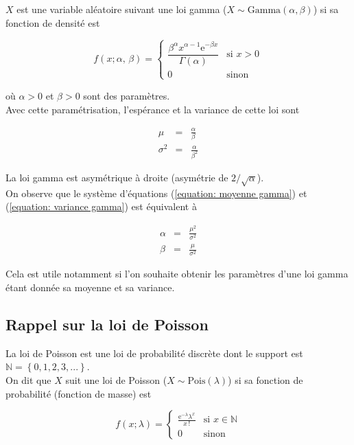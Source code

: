 \documentclass[letterpaper,11pt]{article}
\renewcommand{\exp}[1]{\mathrm{e}^{#1}}
\begin{document}
$X$ est une variable aléatoire suivant une loi gamma ($X\sim\mathrm{Gamma}(\alpha,\beta)$) si sa fonction de densité est

\begin{equation}
f(x; \alpha,\,\beta) =  
\left\{
\begin{array}{cl}
\dfrac{\beta^{\alpha} x^{\alpha-1} \exp{-\beta x}}{\Gamma(\alpha)} & \text{si } x>0\\[0.4cm]
0 & \text{sinon}
\end{array}
\right.
\end{equation}

où $\alpha>0$ et $\beta>0$ sont des paramètres. \\
Avec cette paramétrisation, l'espérance et la variance de cette loi sont

\begin{eqnarray} 
\mu      &=& \frac{\alpha}{\beta} \label{equation: moyenne gamma}\\
\sigma^2 &=& \frac{\alpha}{\beta^2} \label{equation: variance gamma}
\end{eqnarray}

La loi gamma est asymétrique à droite (asymétrie de $2/\sqrt{\alpha}$).\\
On observe que le système d'équations (\ref{equation: moyenne gamma}) et (\ref{equation: variance gamma}) est équivalent à

\begin{eqnarray}
\alpha   &=& \frac{\mu^2}{\sigma^2} \label{equation: alpha gamma}\\
\beta &=& \frac{\mu}{\sigma^2} \label{equation: beta gamma}
\end{eqnarray}

Cela est utile notamment si l'on souhaite obtenir les paramètres d'une loi gamma étant donnée sa moyenne et sa variance.

\subsection{Rappel sur la loi de Poisson}

La loi de Poisson est une loi de probabilité discrète dont le support est $\mathbb{N}=\left\{0,1,2,3,...\right\}.$\\
On dit que $X$ suit une loi de Poisson ($X\sim\mathrm{Pois}(\lambda)$) si sa fonction de probabilité (fonction de masse) est

\begin{equation*}
f(x; \lambda) = 
\left\{
\begin{array}{cl}
\frac{\exp{-\lambda} \lambda^x}{x\,!} & \text{si } x\in\mathbb{N}\\[0.4cm]
0 & \text{sinon}
\end{array}
\right.
\end{equation*}
\end{document}
